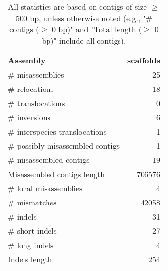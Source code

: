 \documentclass[12pt,a4paper]{article}
\begin{document}
\begin{table}[ht]
\begin{center}
\caption{All statistics are based on contigs of size $\geq$ 500 bp, unless otherwise noted (e.g., "\# contigs ($\geq$ 0 bp)" and "Total length ($\geq$ 0 bp)" include all contigs).}
\begin{tabular}{|l*{1}{|r}|}
\hline
Assembly & scaffolds \\ \hline
\# misassemblies & 25 \\ \hline
\hspace{5mm}\# relocations & 18 \\ \hline
\hspace{5mm}\# translocations & 0 \\ \hline
\hspace{5mm}\# inversions & 6 \\ \hline
\hspace{5mm}\# interspecies translocations & 1 \\ \hline
\# possibly misassembled contigs & 1 \\ \hline
\# misassembled contigs & 19 \\ \hline
Misassembled contigs length & 706576 \\ \hline
\# local misassemblies & 4 \\ \hline
\# mismatches & 42058 \\ \hline
\# indels & 31 \\ \hline
\hspace{5mm}\# short indels & 27 \\ \hline
\hspace{5mm}\# long indels & 4 \\ \hline
Indels length & 254 \\ \hline
\end{tabular}
\end{center}
\end{table}
\end{document}
